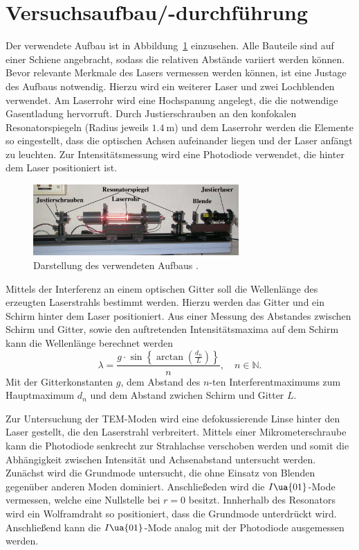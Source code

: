 \section{Versuchsaufbau/-durchführung}
Der verwendete Aufbau ist in Abbildung~\ref{fig: aufbau} einzusehen. Alle Bauteile sind auf einer Schiene angebracht, sodass die
relativen Abstände variiert werden können. Bevor relevante Merkmale des Lasers vermessen werden können, ist eine
Justage des Aufbaus notwendig. Hierzu wird ein weiterer Laser und zwei Lochblenden verwendet. Am Laserrohr wird eine Hochspanung
angelegt, die die notwendige Gasentladung hervorruft. Durch Justierschrauben an den konfokalen Resonatorspiegeln (Radius jeweils $\SI{1.4}{\meter}$)
und dem Laserrohr werden die Elemente so eingestellt, dass die optischen Achsen aufeinander liegen und der Laser anfängt zu leuchten.
Zur Intensitätsmessung wird eine Photodiode verwendet, die hinter dem Laser positioniert ist.
\begin{figure}
  \centering
  \includegraphics[width = 0.7\textwidth]{theorie_bilder/aufbau.png}
  \caption{Darstellung des verwendeten Aufbaus \cite{anleitung61}.}
  \label{fig: aufbau}
\end{figure}

Mittels der Interferenz an einem optischen Gitter soll die Wellenlänge des erzeugten Laserstrahls bestimmt werden. Hierzu werden das Gitter
und ein Schirm hinter dem Laser positioniert. Aus einer Messung des Abstandes zwischen Schirm und Gitter, sowie den auftretenden Intensitätsmaxima
auf dem Schirm kann die Wellenlänge berechnet werden
\begin{equation}
  \lambda = \frac{g \cdot \sin\left\{\arctan\left(\frac{d_n}{L} \right)  \right\}}{n},\quad n \in \mathbb{N}.
  \label{eq: interferenz}
\end{equation}
Mit der Gitterkonstanten $g$, dem Abstand des $n$-ten Interferentmaximums zum Hauptmaximum $d_{n}$ und dem Abstand zwichen Schirm und Gitter $L$.

Zur Untersuchung der TEM-Moden wird eine defokussierende Linse hinter den Laser gestellt, die den Laserstrahl verbreitert.
Mittels einer Mikrometerschraube kann die Photodiode
senkrecht zur Strahlachse verschoben werden und somit die Abhängigkeit zwischen Intensität und Achsenabstand untersucht werden. Zunächst
wird die Grundmode untersucht, die ohne Einsatz von Blenden gegenüber anderen Moden dominiert. Anschließeden wird die $I\ua{01}$-Mode
vermessen, welche eine Nullstelle bei $r = 0$ besitzt. Innherhalb des Resonators wird ein Wolframdraht so positioniert, dass die Grundmode
unterdrückt wird. Anschließend kann die $I\ua{01}$-Mode analog mit der Photodiode ausgemessen werden.

